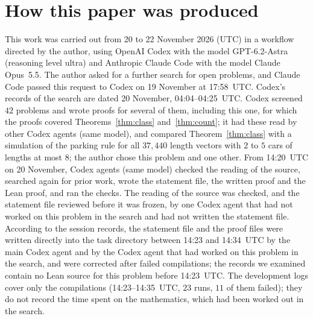 \documentclass[11pt]{article}
\theoremstyle{remark}
\begin{document}
\section*{How this paper was produced}
This work was carried out from 20 to 22 November 2026 (UTC) in a workflow
directed by the author, using OpenAI Codex with the model GPT-6.2-Astra
(reasoning level ultra) and Anthropic Claude Code with the model Claude
Opus~5.5. The author asked for a further search for open problems, and Claude
Code passed this request to Codex on 19 November at 17:58~UTC. Codex's records
of the search are dated 20 November, 04:04--04:25~UTC. Codex screened $42$
problems and wrote proofs for several of them, including this one, for which
the proofs covered Theorems~\ref{thm:class} and~\ref{thm:count}; it had these
read by other Codex agents (same model), and compared Theorem~\ref{thm:class} with a simulation of the parking rule for all
$37{,}440$ length vectors with $2$ to $5$ cars of lengths at most $8$; the
author chose this problem and one other. From
14:20~UTC on 20 November, Codex agents (same model) checked the reading of the
source, searched again for prior work, wrote the statement file, the written
proof and the Lean proof, and ran the checks. The reading of the source was
checked, and the statement file reviewed before it was frozen, by one Codex
agent that had not worked on this problem in the search and had not written
the statement file. According to the session records, the statement file and
the proof files were written directly into the task directory between 14:23
and 14:34~UTC by the main Codex agent and by the Codex agent that had worked on
this problem in the search, and were corrected after failed compilations; the
records we examined contain no Lean source for this problem before 14:23~UTC.
The development logs cover only the compilations (14:23--14:35~UTC, $23$
runs, $11$ of them failed); they do not record the time spent on the
mathematics, which had been worked out in the search.
\end{document}
